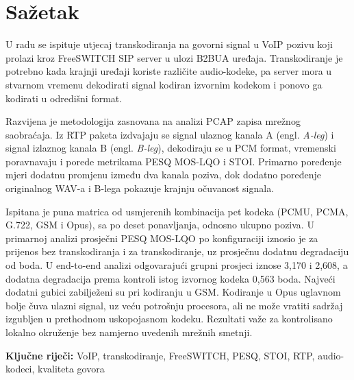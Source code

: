 \chapter*{Sažetak}

U radu se ispituje utjecaj transkodiranja na govorni signal u VoIP pozivu koji prolazi kroz \mbox{FreeSWITCH} SIP server u ulozi B2BUA uređaja. Transkodiranje je potrebno kada krajnji uređaji koriste različite audio-kodeke, pa server mora u stvarnom vremenu dekodirati signal kodiran izvornim kodekom i ponovo ga kodirati u odredišni format.

Razvijena je metodologija zasnovana na analizi PCAP zapisa mrežnog saobraćaja. Iz RTP paketa izdvajaju se signal ulaznog kanala A (engl. \emph{A-leg}) i signal izlaznog kanala B (engl. \emph{B-leg}), dekodiraju se u PCM format, vremenski poravnavaju i porede metrikama PESQ MOS-LQO i STOI. Primarno poređenje mjeri dodatnu promjenu između dva kanala poziva, dok dodatno poređenje originalnog WAV-a i B-lega pokazuje krajnju očuvanost signala.

Ispitana je puna matrica od \BrojKonfiguracija{} usmjerenih kombinacija pet kodeka (PCMU, PCMA, G.722, GSM i Opus), sa po deset ponavljanja, odnosno ukupno \BrojPoziva{} poziva. U primarnoj analizi prosječni PESQ MOS-LQO po konfiguraciji iznosio je \PassthroughPESQ{} za prijenos bez transkodiranja i \TranscodePESQ{} za transkodiranje, uz prosječnu dodatnu degradaciju od \RazlikaPESQ{} boda. U end-to-end analizi odgovarajući grupni prosjeci iznose 3,170 i 2,608, a dodatna degradacija prema kontroli istog izvornog kodeka 0,563 boda. Najveći dodatni gubici zabilježeni su pri kodiranju u GSM. Kodiranje u Opus uglavnom bolje čuva ulazni signal, uz veću potrošnju procesora, ali ne može vratiti sadržaj izgubljen u prethodnom uskopojasnom kodeku. Rezultati važe za kontrolisano lokalno okruženje bez namjerno uvedenih mrežnih smetnji.

\textbf{Ključne riječi:} VoIP, transkodiranje, FreeSWITCH, PESQ, STOI, RTP, audio-kodeci, kvaliteta govora
